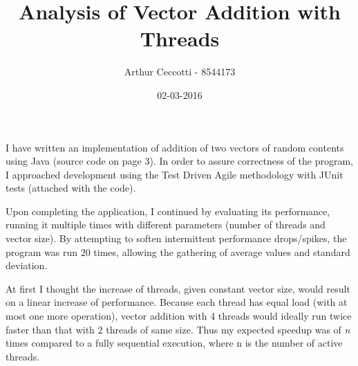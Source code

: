\documentclass{article}
\title{Analysis of Vector Addition with Threads}
\date{02-03-2016}
\author{Arthur Ceccotti - 8544173}
\begin{document}
  \maketitle

  I have written an implementation of addition of two vectors of random contents using Java (source code on page 3).
  In order to assure correctness of the program, I approached development using the Test Driven Agile methodology with JUnit tests (attached with the code).

  Upon completing the application, I continued by evaluating its performance, running it multiple times with different parameters (number of threads and vector size).
  By attempting to soften intermittent performance drops/spikes, the program was run 20 times, allowing the gathering of average values and standard deviation.

  At first I thought the increase of threads, given constant vector size, would result on a linear increase of performance. Because each thread has equal load (with at most one more operation), vector addition with 4 threads would ideally run twice faster than that with 2 threads of same size. Thus my expected speedup was of \textit{n} times compared to a fully sequential execution, where n is the number of active threads.
\end{document}
